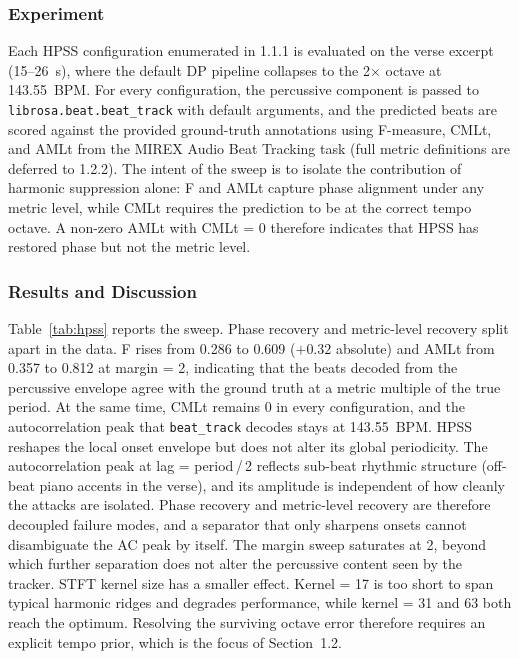 \documentclass{article}
\begin{document}
\subsubsection{Experiment}
Each HPSS configuration enumerated in 1.1.1 is evaluated on the verse excerpt (15--26~s), where the default DP pipeline collapses to the 2$\times$ octave at 143.55~BPM. For every configuration, the percussive component is passed to \texttt{librosa.beat.beat\_track} with default arguments, and the predicted beats are scored against the provided ground-truth annotations using F-measure, CMLt, and AMLt from the MIREX Audio Beat Tracking task \cite{mirex2025beat} (full metric definitions are deferred to 1.2.2). The intent of the sweep is to isolate the contribution of harmonic suppression alone: F and AMLt capture phase alignment under any metric level, while CMLt requires the prediction to be at the correct tempo octave. A non-zero AMLt with CMLt = 0 therefore indicates that HPSS has restored phase but not the metric level.

\subsubsection{Results and Discussion}
Table~\ref{tab:hpss} reports the sweep. Phase recovery and metric-level recovery split apart in the data. F rises from 0.286 to 0.609 ($+0.32$ absolute) and AMLt from 0.357 to 0.812 at margin = 2, indicating that the beats decoded from the percussive envelope agree with the ground truth at a metric multiple of the true period. At the same time, CMLt remains 0 in every configuration, and the autocorrelation peak that \texttt{beat\_track} decodes stays at 143.55~BPM. HPSS reshapes the local onset envelope but does not alter its global periodicity. The autocorrelation peak at lag = period\,/\,2 reflects sub-beat rhythmic structure (off-beat piano accents in the verse), and its amplitude is independent of how cleanly the attacks are isolated. Phase recovery and metric-level recovery are therefore decoupled failure modes, and a separator that only sharpens onsets cannot disambiguate the AC peak by itself. The margin sweep saturates at 2, beyond which further separation does not alter the percussive content seen by the tracker. STFT kernel size has a smaller effect. Kernel = 17 is too short to span typical harmonic ridges and degrades performance, while kernel = 31 and 63 both reach the optimum. Resolving the surviving octave error therefore requires an explicit tempo prior, which is the focus of Section~1.2.
\end{document}
